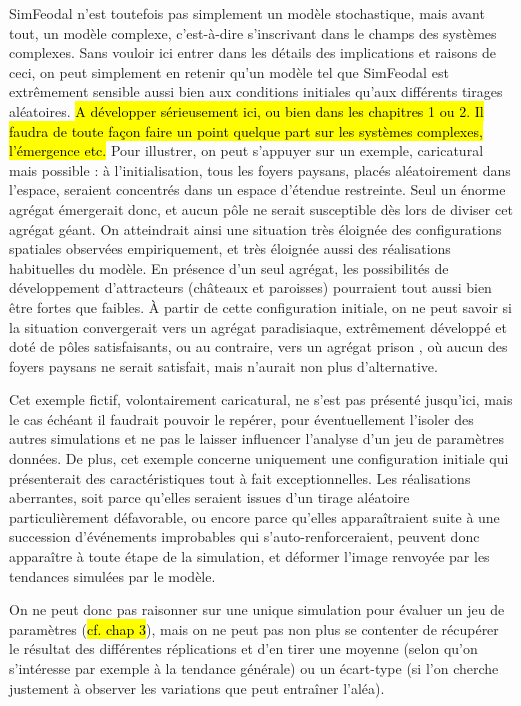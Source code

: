 	SimFeodal n'est toutefois pas simplement un modèle stochastique, mais avant tout, un modèle complexe, c'est-à-dire s'inscrivant dans le champs des systèmes complexes. Sans vouloir ici entrer dans les détails des implications et raisons de ceci, on peut simplement en retenir qu'un modèle tel que SimFeodal est extrêmement sensible aussi bien aux conditions initiales qu'aux différents tirages aléatoires.
	\hl{A développer sérieusement ici, ou bien dans les chapitres 1 ou 2. Il faudra de toute façon faire un point quelque part sur les systèmes complexes, l'émergence etc.}
	Pour illustrer, on peut s'appuyer sur un exemple, caricatural mais possible : à l'initialisation, tous les foyers paysans, placés aléatoirement dans l'espace, seraient concentrés dans un espace d'étendue restreinte.
	Seul un énorme agrégat émergerait donc, et aucun pôle ne serait susceptible dès lors de diviser cet agrégat géant.
	On atteindrait ainsi une situation très éloignée des configurations spatiales observées empiriquement, et très éloignée aussi des réalisations habituelles du modèle.
	En présence d'un seul agrégat, les possibilités de développement d'attracteurs (châteaux et paroisses) pourraient tout aussi bien être fortes que faibles.
	À partir de cette configuration initiale, on ne peut savoir si la situation convergerait vers un agrégat \og paradisiaque\fg{}, extrêmement développé et doté de pôles satisfaisants, ou au contraire, vers un agrégat \og prison \fg{}, où aucun des foyers paysans ne serait satisfait, mais n'aurait non plus d'alternative.
	
	Cet exemple fictif, volontairement caricatural, ne s'est pas présenté jusqu'ici, mais le cas échéant il faudrait pouvoir le repérer, pour éventuellement l'isoler des autres simulations et ne pas le laisser influencer l'analyse d'un jeu de paramètres données.
	De plus, cet exemple concerne uniquement une configuration initiale qui présenterait des caractéristiques tout à fait exceptionnelles.
	Les réalisations aberrantes, soit parce qu'elles seraient issues d'un tirage aléatoire particulièrement défavorable, ou encore parce qu'elles apparaîtraient suite à une succession d'événements improbables qui s'auto-renforceraient, peuvent donc apparaître à toute étape de la simulation, et déformer l'image renvoyée par les tendances simulées par le modèle.
	
	On ne peut donc pas raisonner sur une unique simulation pour évaluer un jeu de paramètres (\hl{cf. chap 3}), mais on ne peut pas non plus se contenter de récupérer le résultat des différentes réplications et d'en tirer une moyenne (selon qu'on s'intéresse par exemple à la tendance générale) ou un écart-type (si l'on cherche justement à observer les variations que peut entraîner l'aléa).

